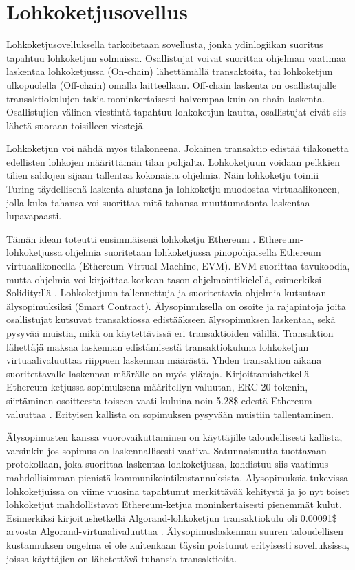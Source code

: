 \section{Lohkoketjusovellus}

Lohkoketjusovelluksella tarkoitetaan sovellusta, jonka ydinlogiikan suoritus tapahtuu lohkoketjun solmuissa. Osallistujat voivat suorittaa ohjelman vaatimaa laskentaa lohkoketjussa (On-chain) lähettämällä transaktoita, tai lohkoketjun ulkopuolella (Off-chain) omalla laitteellaan. Off-chain laskenta on osallistujalle transaktiokulujen takia moninkertaisesti halvempaa kuin on-chain laskenta. Osallistujien välinen viestintä tapahtuu lohkoketjun kautta, osallistujat eivät siis lähetä suoraan toisilleen viestejä.

Lohkoketjun voi nähdä myös tilakoneena. Jokainen transaktio edistää tilakonetta edellisten lohkojen määrittämän tilan pohjalta. Lohkoketjuun voidaan pelkkien tilien saldojen sijaan tallentaa kokonaisia ohjelmia. Näin lohkoketju toimii Turing-täydellisenä laskenta-alustana ja lohkoketju muodostaa virtuaalikoneen, jolla kuka tahansa voi suorittaa mitä tahansa muuttumatonta laskentaa lupavapaasti.

Tämän idean toteutti ensimmäisenä lohkoketju Ethereum \cite{buterin_ethereum_2014}. Ethereum-lohkoketjussa ohjelmia suoritetaan lohkoketjussa pinopohjaisella Ethereum virtuaalikoneella (Ethereum Virtual Machine, EVM). EVM suorittaa tavukoodia, mutta ohjelmia voi kirjoittaa korkean tason ohjelmointikielellä, esimerkiksi Solidity:llä \cite{noauthor_solidity_nodate}. Lohkoketjuun tallennettuja ja suoritettavia ohjelmia kutsutaan älysopimuksiksi (Smart Contract).  Älysopimuksella on osoite ja rajapintoja joita osallistujat kutsuvat transaktiossa edistääkseen älysopimuksen laskentaa, sekä pysyvää muistia, mikä on käytettävissä eri transaktioiden välillä. Transaktion lähettäjä maksaa laskennan edistämisestä transaktiokuluna lohkoketjun virtuaalivaluuttaa riippuen laskennan määrästä. Yhden transaktion aikana suoritettavalle laskennan määrälle on myös yläraja. Kirjoittamishetkellä Ethereum-ketjussa sopimuksena määritellyn valuutan, ERC-20 tokenin, siirtäminen osoitteesta toiseen vaati kuluina noin 5.28\$ edestä Ethereum-valuuttaa \cite{etherscanio_ethereum_nodate}. Erityisen kallista on sopimuksen pysyvään muistiin tallentaminen.

Älysopimusten kanssa vuorovaikuttaminen on käyttäjille taloudellisesti kallista, varsinkin jos sopimus on laskennallisesti vaativa. Satunnaisuutta tuottavaan protokollaan, joka suorittaa laskentaa lohkoketjussa, kohdistuu siis vaatimus mahdollisimman pienistä kommunikointikustannuksista. Älysopimuksia tukevissa lohkoketjuissa on viime vuosina tapahtunut merkittävää kehitystä ja jo nyt toiset lohkoketjut mahdollistavat Ethereum-ketjua moninkertaisesti pienemmät kulut. Esimerkiksi kirjoitushetkellä Algorand-lohkoketjun transaktiokulu oli 0.00091\$ arvosta Algorand-virtuaalivaluuttaa \cite{noauthor_algorand_nodate}. Älysopimuslaskennan suuren taloudellisen kustannuksen ongelma ei ole kuitenkaan täysin poistunut erityisesti sovelluksissa, joissa käyttäjien on lähetettävä tuhansia transaktioita.

